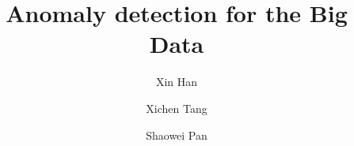 \documentclass{amsart}
\begin{document}
%
%
\title[A Short Running Title]{Anomaly detection for the Big Data}%

\author{Xin Han}
\address[A.~1]{School of Computer Science\\
Xi'an Shiyou University, Shaanxi 710065, China}%

\author{Xichen Tang}
\address[A.~2]{School of Information and Control Engineering \\
Qingdao University of Technology, Qingdao 266033, China}%


\author{Shaowei Pan}
\address[A.~3]{School of Computer Science \\
Xi'an Shiyou University, Shaanxi 710065, China}%

%
%
\date{\gitAuthorDate}%


\maketitle







\end{document}
